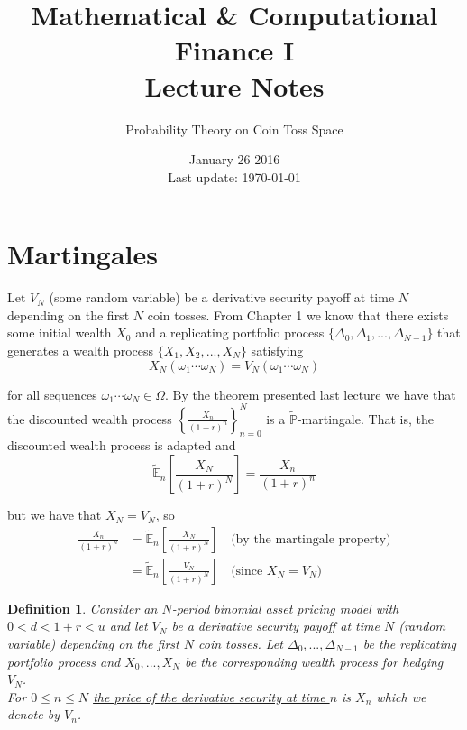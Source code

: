 \documentclass[12pt]{article}
\newtheorem{definition}{Definition}
\newlength\tindent
\renewcommand{\indent}{\hspace*{\tindent}}
\renewcommand{\P}{\mathbb P}
\newcommand{\E}{\mathbb E}
\begin{document}
 
 
\title{Mathematical \& Computational Finance I\\Lecture Notes}
\author{Probability Theory on Coin Toss Space}
\date{January 26 2016 \\ Last update: \today{}}
\maketitle

\section{Martingales}

\indent Let $V_N$ (some random variable) be a derivative security payoff at time $N$ depending on the first $N$ coin tosses. From Chapter 1 we know that there exists some initial wealth $X_0$ and a replicating portfolio process $\{\Delta_0, \Delta_1, ..., \Delta_{N - 1}\}$ that generates a wealth process $\{X_1, X_2, ..., X_N\}$ satisfying
\begin{equation*}
	X_N(\omega_1\cdots\omega_N) = V_N(\omega_1\cdots\omega_N)
\end{equation*}

for all sequences $\omega_1\cdots\omega_N \in \Omega$. By the theorem presented last lecture we have that the discounted wealth process $\left\{\frac{X_n}{(1 + r)^n}\right\}^N_{n = 0}$ is a $\tilde{\P}$-martingale. That is, the discounted wealth process is adapted and
\begin{equation*}
	\tilde{\E}_n \left[ \frac{X_N}{(1 + r)^N} \right] = \frac{X_n}{(1 + r)^n}
\end{equation*}

but we have that $X_N = V_N$, so
\begin{align*}
	\frac{X_n}{(1 + r)^n}&= \tilde{\E}_n \left[ \frac{X_N}{(1 + r)^N} \right] \quad \text{(by the martingale property)} \\
	&= \tilde{\E}_n \left[ \frac{V_N}{(1 + r)^N} \right] \quad \text{(since } X_N = V_N)
\end{align*}

\begin{definition} Consider an $N$-period binomial asset pricing model with $0 < d < 1 + r < u$ and let $V_N$ be a derivative security payoff at time $N$ (random variable) depending on the first $N$ coin tosses. Let $\Delta_0,...,\Delta_{N - 1}$ be the replicating portfolio process and $X_0, ..., X_N$ be the corresponding wealth process for hedging $V_N$. \\

\indent For $0 \leq n \leq N$ \underline{the price of the derivative security at time $n$} is $X_n$ which we denote by $V_n$.
\end{definition}
\end{document}
